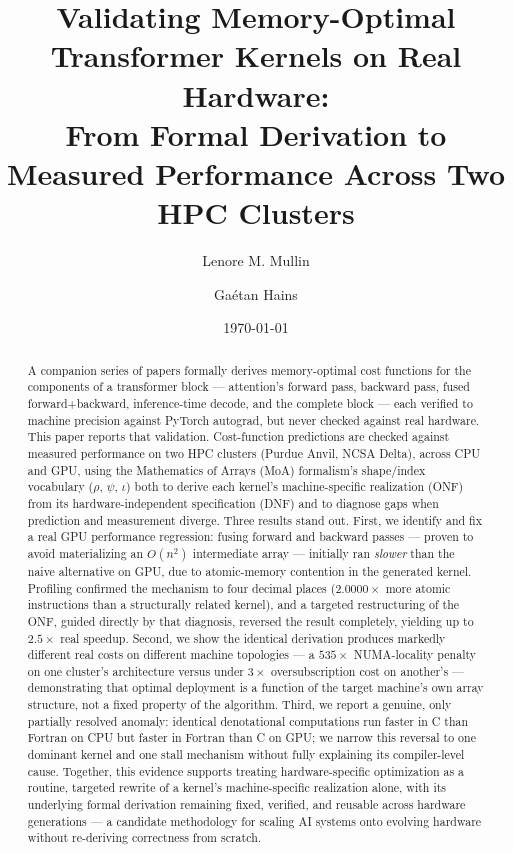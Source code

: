 \documentclass[11pt]{article}
\title{Validating Memory-Optimal Transformer Kernels on Real Hardware:\\
From Formal Derivation to Measured Performance Across Two HPC Clusters}
\author[1]{Lenore M. Mullin}
\author[2]{Ga\'etan Hains}
\affil[1]{Professor Emerita, College of Nanotechnology, Science, and Engineering, University at Albany (SUNY), Albany, NY, USA. \texttt{lmullin@albany.edu}}
\affil[2]{LACL, Universit\'e Paris-Est Cr\'eteil, Cr\'eteil, France. \texttt{gaetan.hains@u-pec.fr}}
\date{\today}
\begin{document}
\sloppy
\maketitle

\begin{abstract}
A companion series of papers formally derives memory-optimal cost
functions for the components of a transformer block --- attention's
forward pass, backward pass, fused forward+backward, inference-time
decode, and the complete block --- each verified to machine precision
against PyTorch autograd, but never checked against real hardware. This
paper reports that validation. Cost-function predictions are checked
against measured performance on two HPC clusters (Purdue Anvil, NCSA
Delta), across CPU and GPU, using the Mathematics of Arrays (MoA)
formalism's shape/index vocabulary ($\rho$, $\psi$, $\iota$) both to
derive each kernel's machine-specific realization (ONF) from its
hardware-independent specification (DNF) and to diagnose gaps when
prediction and measurement diverge. Three results stand out. First, we
identify and fix a real GPU performance regression: fusing forward and
backward passes --- proven to avoid materializing an $O(n^2)$
intermediate array --- initially ran \emph{slower} than the naive
alternative on GPU, due to atomic-memory contention in the generated
kernel. Profiling confirmed the mechanism to four decimal places
($2.0000\times$ more atomic instructions than a structurally related
kernel), and a targeted restructuring of the ONF, guided directly by
that diagnosis, reversed the result completely, yielding up to
$2.5\times$ real speedup. Second, we show the identical derivation
produces markedly different real costs on different machine
topologies --- a $535\times$ NUMA-locality penalty on one cluster's
architecture versus under $3\times$ oversubscription cost on another's
--- demonstrating that optimal deployment is a function of the target
machine's own array structure, not a fixed property of the algorithm.
Third, we report a genuine, only partially resolved anomaly: identical
denotational computations run faster in C than Fortran on CPU but
faster in Fortran than C on GPU; we narrow this reversal to one
dominant kernel and one stall mechanism without fully explaining its
compiler-level cause. Together, this evidence supports treating
hardware-specific optimization as a routine, targeted rewrite of a
kernel's machine-specific realization alone, with its underlying formal
derivation remaining fixed, verified, and reusable across hardware
generations --- a candidate methodology for scaling AI systems onto
evolving hardware without re-deriving correctness from scratch.
\end{abstract}
\end{document}
